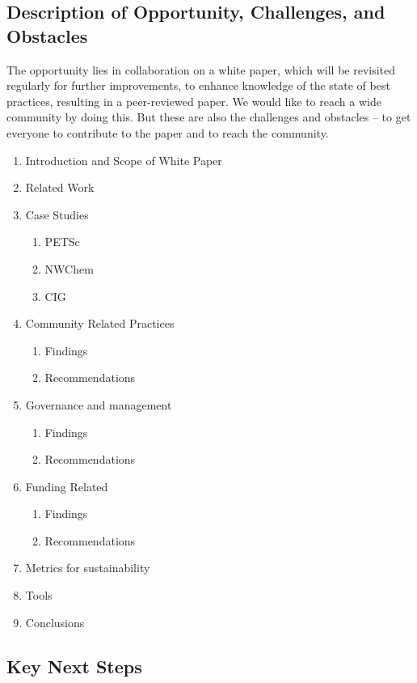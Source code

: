 \subsection{Description of Opportunity, Challenges, and Obstacles}

The opportunity lies in collaboration on a white paper, which will be revisited
regularly for further improvements, to enhance knowledge of the state of best
practices, resulting in a peer-reviewed paper. We would like to reach a wide
community by doing this. But these are also the challenges and obstacles -- to
get everyone to contribute to the paper and to reach the community.

\begin{enumerate}
\item Introduction and Scope of White Paper 
\item Related Work
\item Case Studies
\begin{enumerate} 
\item PETSc
\item NWChem
\item CIG
\end{enumerate}
\item Community Related Practices
\begin{enumerate} 
\item Findings
\item Recommendations
\end{enumerate}
\item Governance and management
\begin{enumerate} 
\item Findings
\item Recommendations
\end{enumerate}
\item Funding Related
\begin{enumerate} 
\item Findings
\item Recommendations
\end{enumerate}
\item Metrics for sustainability
\item Tools
\item Conclusions
\end{enumerate}

\subsection{Key Next Steps}

